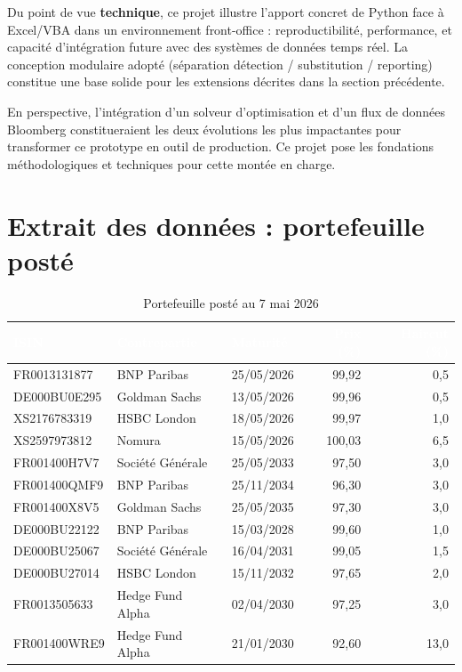 \documentclass[12pt,a4paper]{article}
\begin{document}
Du point de vue \textbf{technique}, ce projet illustre l'apport concret de Python face
à Excel/VBA dans un environnement front-office : reproductibilité, performance, et
capacité d'intégration future avec des systèmes de données temps réel. La conception
modulaire adopté (séparation détection / substitution / reporting) constitue une base
solide pour les extensions décrites dans la section précédente.

En perspective, l'intégration d'un solveur d'optimisation et d'un flux de données
Bloomberg constitueraient les deux évolutions les plus impactantes pour transformer ce
prototype en outil de production. Ce projet pose les fondations méthodologiques
et techniques pour cette montée en charge.

\newpage
\appendix
\section{Extrait des données : portefeuille posté}

\begin{table}[H]
\centering
\small
\renewcommand{\arraystretch}{1.2}
\begin{tabularx}{\linewidth}{p{2.8cm} p{4cm} p{2cm} r r}
\toprule
\rowcolor{natixisBlue}
\textcolor{white}{\textbf{ISIN}} &
\textcolor{white}{\textbf{Contrepartie}} &
\textcolor{white}{\textbf{Maturité}} &
\textcolor{white}{\textbf{Prix (\%)}} &
\textcolor{white}{\textbf{Haircut (\%)}} \\
\midrule
FR0013131877 & BNP Paribas & 25/05/2026 & 99,92 & 0,5 \\
\rowcolor{natixisGray}
DE000BU0E295 & Goldman Sachs & 13/05/2026 & 99,96 & 0,5 \\
XS2176783319 & HSBC London & 18/05/2026 & 99,97 & 1,0 \\
\rowcolor{natixisGray}
XS2597973812 & Nomura & 15/05/2026 & 100,03 & 6,5 \\
FR001400H7V7 & Société Générale & 25/05/2033 & 97,50 & 3,0 \\
\rowcolor{natixisGray}
FR001400QMF9 & BNP Paribas & 25/11/2034 & 96,30 & 3,0 \\
FR001400X8V5 & Goldman Sachs & 25/05/2035 & 97,30 & 3,0 \\
\rowcolor{natixisGray}
DE000BU22122 & BNP Paribas & 15/03/2028 & 99,60 & 1,0 \\
DE000BU25067 & Société Générale & 16/04/2031 & 99,05 & 1,5 \\
\rowcolor{natixisGray}
DE000BU27014 & HSBC London & 15/11/2032 & 97,65 & 2,0 \\
FR0013505633 & Hedge Fund Alpha & 02/04/2030 & 97,25 & 3,0 \\
\rowcolor{natixisGray}
FR001400WRE9 & Hedge Fund Alpha & 21/01/2030 & 92,60 & 13,0 \\
\bottomrule
\end{tabularx}
\caption{Portefeuille posté au 7 mai 2026}
\end{table}
\end{document}

